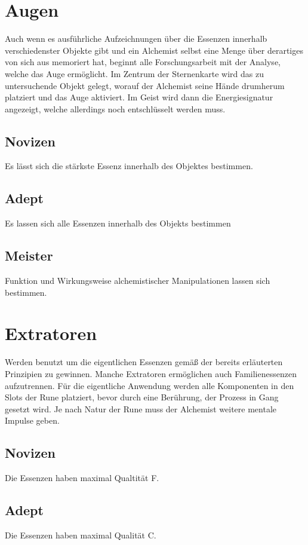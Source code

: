 \documentclass[a4paper,12pt,oneside]{book}
\begin{document}
\section{Augen}
Auch wenn es ausführliche Aufzeichnungen über die Essenzen innerhalb verschiedenster Objekte gibt und ein Alchemist selbst eine Menge über derartiges von sich aus memoriert hat, beginnt alle Forschungsarbeit mit der Analyse, welche das Auge ermöglicht. Im Zentrum der Sternenkarte wird das zu untersuchende Objekt gelegt, worauf der Alchemist seine Hände drumherum platziert und das Auge aktiviert. Im Geist wird dann die Energiesignatur angezeigt, welche allerdings noch entschlüsselt werden muss. 

\subsection{Novizen}
Es lässt sich die stärkste Essenz innerhalb des Objektes bestimmen.

\subsection{Adept}
Es lassen sich alle Essenzen innerhalb des Objekts bestimmen

\subsection{Meister}
Funktion und Wirkungsweise alchemistischer Manipulationen lassen sich bestimmen.

\section{Extratoren}
Werden benutzt um die eigentlichen Essenzen gemäß der bereits erläuterten Prinzipien zu gewinnen. Manche Extratoren ermöglichen auch Familienessenzen aufzutrennen. Für die eigentliche Anwendung werden alle Komponenten in den Slots der Rune platziert, bevor durch eine Berührung, der Prozess in Gang gesetzt wird. Je nach Natur der Rune muss der Alchemist weitere mentale Impulse geben.

\subsection{Novizen}
Die Essenzen haben maximal Qualtität F.

\subsection{Adept}
Die Essenzen haben maximal Qualität C.
\end{document}
